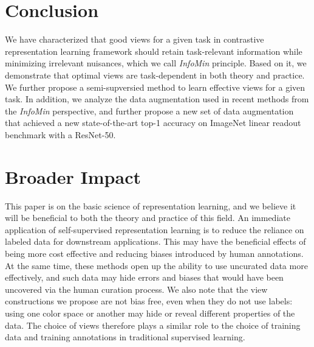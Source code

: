 \documentclass{article}
\begin{document}
 

\section{Conclusion}
We have characterized that good views for a given task in contrastive representation learning framework should retain task-relevant information while minimizing irrelevant nuisances, which we call \emph{InfoMin} principle. Based on it, we demonstrate that optimal views are task-dependent in both theory and practice. We further propose a semi-supversied method to learn effective views for a given task. In addition, we analyze the data augmentation used in recent methods from the \emph{InfoMin} perspective, and further propose a new set of data augmentation that achieved a new state-of-the-art top-1 accuracy on ImageNet linear readout benchmark with a ResNet-50.

 

\clearpage

\section*{Broader Impact}
This paper is on the basic science of representation learning, and we believe it will be beneficial to both the theory and practice of this field. An immediate application of self-supervised representation learning is to reduce the reliance on labeled data for downstream applications. This may have the beneficial effects of being more cost effective and reducing biases introduced by human annotations. At the same time, these methods open up the ability to use uncurated data more effectively, and such data may hide errors and biases that would have been uncovered via the human curation process. We also note that the view constructions we propose are not bias free, even when they do not use labels: using one color space or another may hide or reveal different properties of the data. The choice of views therefore plays a similar role to the choice of training data and training annotations in traditional supervised learning.
\end{document}
